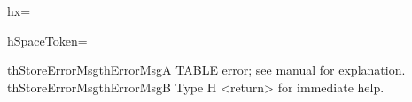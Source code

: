 
\def\!thMessage#1{\immediate\write16{#1}\ignorespaces}

\let\!thx=\expandafter

\def\!thGobble#1{}

\def\\{\let\!thSpaceToken= }\\

\def\!thHeight{height}
\def\!thDepth{depth}
\def\!thWidth{width}

\def\!thToksEdef#1=#2{%
  \edef\!ttemp{#2}%
  #1\!thx{\!ttemp}%
  \ignorespaces}



\def\!thStoreErrorMsg#1#2{%
  \toks0 =\!thx{\csname #2\endcsname}%
  \edef#1{\the\toks0 }}

\def\!thReadErrorMsg#1{%
  \!thx\!thx\!thx\!thGobble\!thx\string #1}

\def\!thError#1#2{%
  \begingroup
    \newlinechar=`\^^J%
    \edef\!ttemp{#2}%
    \errhelp=\!thx{\!ttemp}%
    \!thMessage{%
      ^^J\!thReadErrorMsg\!thErrorMsgA
      ^^J\!thReadErrorMsg\!thErrorMsgB}%
    \errmessage{#1}%
  \endgroup}

\!thStoreErrorMsg\!thErrorMsgA{%
  TABLE error; see manual for explanation.}
\!thStoreErrorMsg\!thErrorMsgB{%
  Type \space H <return> \space for immediate help.}

\def\!thGetReplacement#1#2{%
   \begingroup
     \!thMessage{#1}
     \endlinechar=-1
     \global\read16 to#2%
   \endgroup}



